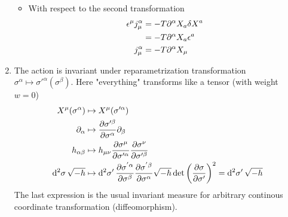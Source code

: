\begin{enumerate}[label=(\alph*)]
\begin{itemize}
			\item With respect to the second transformation
				\begin{align}
					\epsilon^\mu j^\alpha_\mu &= -T \partial^\alpha X_a \delta X^a \notag \\
													  &= -T \partial^\alpha X_a \epsilon^a  \notag \\
													 j^\alpha_\mu &= -T \partial^\alpha X_\mu
				\end{align}
		\end{itemize}
	\item The action is invariant under reparametrization transformation $\sigma^\alpha \mapsto \sigma'^\alpha (\sigma^\beta)$. Here "everything" transforms like a tensor (with weight $w=0$)
		\begin{align*}
			X^\mu (\sigma^\alpha) &\mapsto X^\mu (\sigma'^\alpha) \\
			\partial_\alpha &\mapsto \pdv{\sigma'^\beta}{\sigma^\alpha} \partial_\beta \\
			h_{\alpha \beta} &\mapsto h_{\mu\nu} \pdv{\sigma^\mu}{\sigma'^\alpha} \pdv{\sigma^\nu}{\sigma'^\beta} \\
			\dd[2]{\sigma}\sqrt{-h} &\mapsto \dd[2]{\sigma'} \pdv{\sigma^{'\alpha}}{\sigma^\beta} \pdv{\sigma^{' \beta}}{\sigma^\alpha}  \sqrt{- h}  \det \left(\pdv{\sigma}{\sigma'} \right)^2 = \dd[2]{\sigma'} \sqrt{-h}
		\end{align*}
		The last expression is the usual invariant measure for arbitrary continous coordinate transformation (diffeomorphism).


\end{enumerate}
